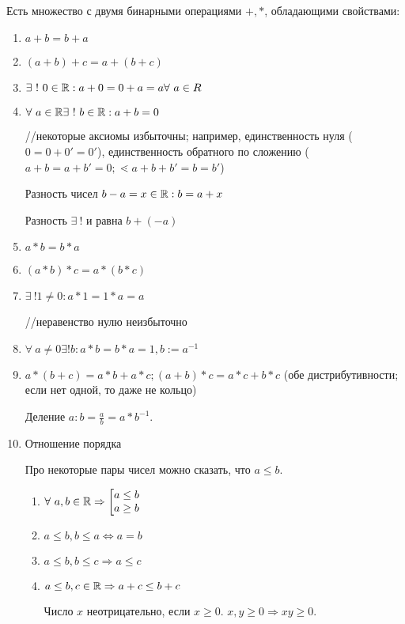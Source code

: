 \documentclass[12pt]{report}
\begin{document}
\begin{defn}[ = Аксиоматический подход к построению $\R$]
Есть множество с двумя бинарными операциями $+, *$, обладающими свойствами:
\begin{enumerate}
\item $a + b = b + a$
\item $(a + b) + c = a + (b + c)$
\item $\exists ~! ~0 \in \mathbb{R}: a + 0 = 0 + a = a \forall ~a \in R$
\item $\forall ~a \in \mathbb{R} \exists ~! ~b \in \mathbb{R}: a + b =  0$

//некоторые аксиомы избыточны; например, единственность нуля ($0 = 0 + 0' = 0'$), единственность обратного по сложению ($ a + b = a + b' = 0; \lessdot a + b + b' = b = b'$)

Разность чисел $b - a = x \in \mathbb{R}: b = a + x$

\begin{st}
Разность $\exists ~!$ и равна $b + (- a)$
\end{st}

\item $a * b = b * a$
\item $(a * b) * c = a * (b * c)$
\item $\exists ~! 1 \neq 0 : a * 1 = 1 * a = a$

//неравенство нулю неизбыточно

\item $\forall ~a \neq 0 \exists ! b: a * b = b * a = 1, b := a^{-1}$
\item $a * (b + c) = a * b + a * c; (a + b) * c = a * c + b * c$ (обе дистрибутивности; если нет одной, то даже не кольцо)

Деление $a : b = \frac{a}{b} = a * b^{-1}$.

\item Отношение порядка

Про некоторые пары чисел можно сказать, что $a \le b$.
\begin{enumerate}
\item $\forall ~a, b \in \mathbb{R} \Rightarrow 
\left[
\begin{matrix}
a \le b\\
a \ge b
\end{matrix}
\right.
$
\item $a \le b, b \le a \Leftrightarrow a = b$
\item $a \le b, b \le c \Rightarrow a \le c$
\item $a \le b, c \in \mathbb{R} \Rightarrow a + c \le b + c$
\begin{defn}
Число $x$ неотрицательно, если $x \ge 0$. $x, y \ge 0 \Rightarrow xy \ge 0$.
\end{defn}
\end{enumerate}


\end{enumerate}
\end{defn}
\end{document}
